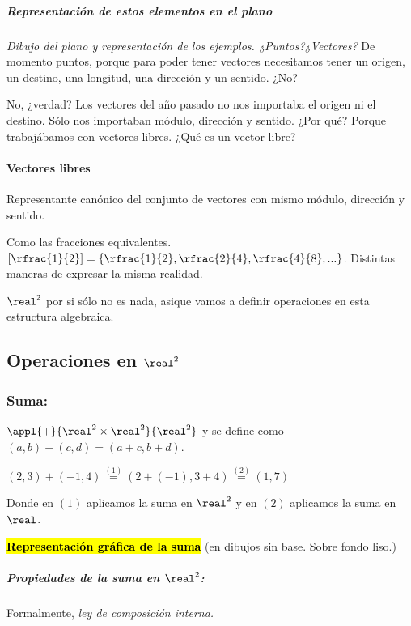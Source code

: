 \subparagraph{Representación de estos elementos en el plano}

\textit{Dibujo del plano y representación de los ejemplos. ¿Puntos?¿Vectores?}
De momento puntos, porque para poder tener vectores necesitamos tener un origen, un destino, una longitud, una dirección y un sentido. ¿No?

No, ¿verdad? Los vectores del año pasado no nos importaba el origen ni el destino. Sólo nos importaban módulo, dirección y sentido. ¿Por qué? Porque trabajábamos con vectores libres. ¿Qué es un vector libre?

\paragraph*{Vectores libres}

\begin{defn}
Representante canónico del conjunto de vectores con mismo módulo, dirección y sentido.
\end{defn}

Como las fracciones equivalentes. $[\rfrac{1}{2}] = \{\rfrac{1}{2},\rfrac{2}{4},\rfrac{4}{8},...\}$. Distintas maneras de expresar la misma realidad.



$\real^2$ por si sólo no es nada, asique vamos a definir operaciones en esta estructura algebraica.



\subsection{Operaciones en $\real^2$}
\subsubsection{Suma:}
$\appl{+}{\real^2\times\real^2}{\real^2}$  y se define como $(a,b)+(c,d) = (a+c,b+d)$.

\begin{example}
$(2,3) + (-1,4) \overset{(1)}{=} (2+(-1),3+4)  \overset{(2)}{=} (1,7)$

Donde en $(1)$ aplicamos la suma en $\real^2$ y en $(2)$ aplicamos la suma en $\real$.

\hl{\textbf{Representación gráfica de la suma}} (en dibujos sin base. Sobre fondo liso.)

\end{example}

\subparagraph{Propiedades de la suma en $\real^2$:} Formalmente, \textit{ley de composición interna.}

